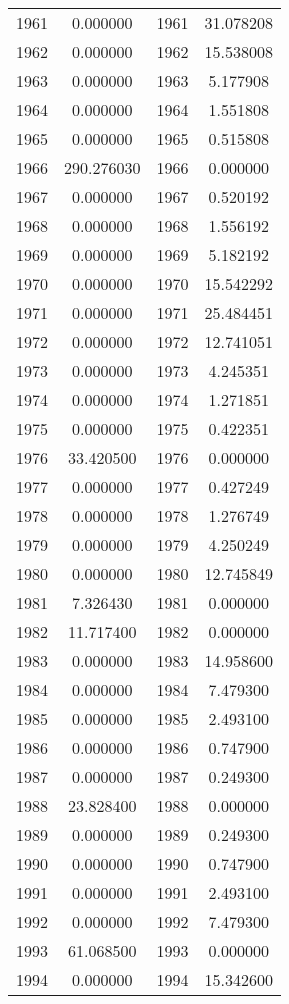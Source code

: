 \documentclass[12pt]{article}
\begin{document}
\begin{longtable}{@{}cccc@{}}
1961 & 0.000000 & 1961 & 31.078208 \\
1962 & 0.000000 & 1962 & 15.538008 \\
1963 & 0.000000 & 1963 & 5.177908 \\
1964 & 0.000000 & 1964 & 1.551808 \\
1965 & 0.000000 & 1965 & 0.515808 \\
1966 & 290.276030 & 1966 & 0.000000 \\
1967 & 0.000000 & 1967 & 0.520192 \\
1968 & 0.000000 & 1968 & 1.556192 \\
1969 & 0.000000 & 1969 & 5.182192 \\
1970 & 0.000000 & 1970 & 15.542292 \\
1971 & 0.000000 & 1971 & 25.484451 \\
1972 & 0.000000 & 1972 & 12.741051 \\
1973 & 0.000000 & 1973 & 4.245351 \\
1974 & 0.000000 & 1974 & 1.271851 \\
1975 & 0.000000 & 1975 & 0.422351 \\
1976 & 33.420500 & 1976 & 0.000000 \\
1977 & 0.000000 & 1977 & 0.427249 \\
1978 & 0.000000 & 1978 & 1.276749 \\
1979 & 0.000000 & 1979 & 4.250249 \\
1980 & 0.000000 & 1980 & 12.745849 \\
1981 & 7.326430 & 1981 & 0.000000 \\
1982 & 11.717400 & 1982 & 0.000000 \\
1983 & 0.000000 & 1983 & 14.958600 \\
1984 & 0.000000 & 1984 & 7.479300 \\
1985 & 0.000000 & 1985 & 2.493100 \\
1986 & 0.000000 & 1986 & 0.747900 \\
1987 & 0.000000 & 1987 & 0.249300 \\
1988 & 23.828400 & 1988 & 0.000000 \\
1989 & 0.000000 & 1989 & 0.249300 \\
1990 & 0.000000 & 1990 & 0.747900 \\
1991 & 0.000000 & 1991 & 2.493100 \\
1992 & 0.000000 & 1992 & 7.479300 \\
1993 & 61.068500 & 1993 & 0.000000 \\
1994 & 0.000000 & 1994 & 15.342600 \\

\end{longtable}
\end{document}

